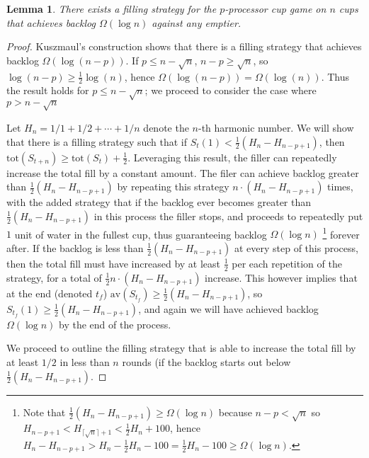 \documentclass[twocolumn]{article}[11pt]
\newtheorem{lemma}{Lemma}
\begin{document}
\begin{lemma}
  There exists a filling strategy for the $p$-processor cup game on $n$ cups
  that achieves backlog $\Omega(\log n)$ against any emptier.
\end{lemma}
\begin{proof}
Kuszmaul's construction shows that there is a filling strategy that achieves
backlog $\Omega(\log (n-p))$.  If $p \le n - \sqrt{n}$, $n-p \ge \sqrt{n}$, so $\log
(n-p) \ge \frac{1}{2}\log (n)$, hence $\Omega(\log(n-p)) = \Omega(\log(n))$.
Thus the result holds for $p \le n - \sqrt{n}$; we proceed to consider the case
where $p > n-\sqrt{n}$

Let $H_n = 1/1+1/2+\cdots +1/n$ denote the $n$-th harmonic number.  We will
show that there is a filling strategy such that if $S_t(1) < \frac{1}{2} (H_n -
H_{n-p+1})$, then $\text{tot}(S_{t+n}) \ge \text{tot}(S_t) + \frac{1}{2}$.
Leveraging this result, the filler can repeatedly increase the total fill by a
constant amount. The filer can achieve backlog greater than $\frac{1}{2}(H_n -
H_{n-p+1})$ by repeating this strategy $n\cdot (H_n-H_{n-p+1})$ times, with the
added strategy that if the backlog ever becomes greater than
$\frac{1}{2}(H_n-H_{n-p+1})$ in this process the filler stops, and proceeds
to repeatedly put $1$ unit of water in the fullest cup, thus guaranteeing
backlog $\Omega(\log n)$ \footnote{ Note that $\frac{1}{2} (H_n - H_{n-p+1}) \ge
\Omega(\log n)$ because $n - p < \sqrt{n}$ so $H_{n-p+1} <
H_{\lceil\sqrt{n}\rceil + 1} < \frac{1}{2} H_n + 100$, hence $H_n - H_{n-p+1} > H_n -
\frac{1}{2}H_n- 100 = \frac{1}{2} H_n - 100 \ge \Omega(\log n)$.  } forever
after. If the backlog is less than $\frac{1}{2} (H_n-H_{n-p+1})$ at every step of
this process, then the total fill must have increased by at least $\frac{1}{2}
$ per each repetition of the strategy, for a total of $\frac{1}{2}n \cdot
(H_{n} - H_{n-p+1})$ increase. This however implies that at the end (denoted
$t_f$) $\text{av}(S_{t_f}) \ge \frac{1}{2} (H_n-H_{n-p+1})$, so $S_{t_f}(1) \ge
\frac{1}{2} (H_n - H_{n-p+1})$, and again we will have achieved backlog
$\Omega(\log n)$ by the end of the process. 

We proceed to outline the filling strategy that is able to increase the total
fill by at least $1/2$ in less than $n$ rounds (if the backlog starts out below
$\frac{1}{2}(H_n - H_{n-p+1})$.


\end{proof}
\end{document}
